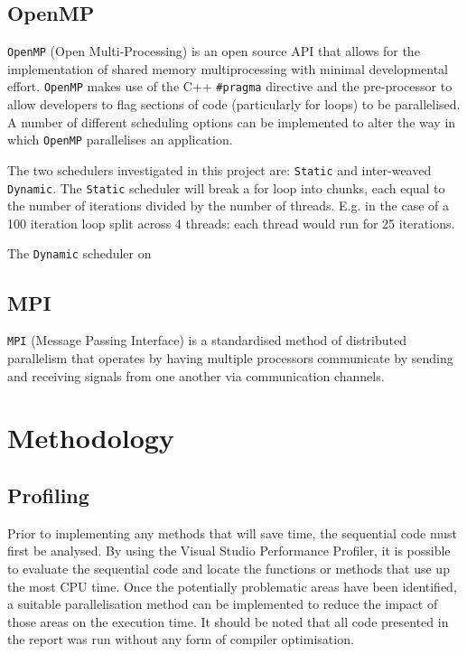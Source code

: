 \documentclass[journal,transmag]{IEEEtran}
\begin{document}
	\subsection{OpenMP}
		\texttt{OpenMP} (Open Multi-Processing) is an open source API that allows for the implementation of shared memory multiprocessing with minimal developmental effort. \texttt{OpenMP} makes use of the C++ \texttt{\#pragma} directive and the pre-processor to allow developers to flag sections of code (particularly for loops) to be parallelised. A number of different scheduling options can be implemented to alter the way in which \texttt{OpenMP} parallelises an application.
		
		The two schedulers investigated in this project are: \texttt{Static} and inter-weaved \texttt{Dynamic}. The \texttt{Static} scheduler will break a for loop into chunks, each equal to the number of iterations divided by the number of threads. E.g. in the case of a 100 iteration loop split across 4 threads: each thread would run for 25 iterations.
		
		The \texttt{Dynamic} scheduler on

	\subsection{MPI}
		\texttt{MPI} (Message Passing Interface) is a standardised method of distributed parallelism that operates by having multiple processors communicate by sending and receiving signals from one another via communication channels. 
		
\section{Methodology}
		
	\subsection{Profiling}
		Prior to implementing any methods that will save time, the sequential code must first be analysed. By using the Visual Studio Performance Profiler, it is possible to evaluate the sequential code and locate the functions or methods that use up the most CPU time. Once the potentially problematic areas have been identified, a suitable parallelisation method can be implemented to reduce the impact of those areas on the execution time. It should be noted that all code presented in the report was run without any form of compiler optimisation.
		
\end{document}
